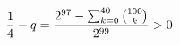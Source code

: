 \documentclass[preview]{standalone}
\begin{document}
\begin{align*}
\special{dvisvgm:raw <g id='unique000'>}\frac14-q=\frac{2^{97}-\sum_{k=0}^{40}\binom{100}{k}}{2^{99}}>0\special{dvisvgm:raw </g>}
\end{align*}
\end{document}
